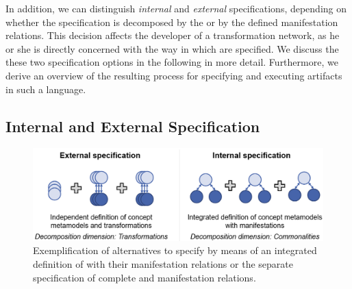 In addition, we can distinguish \emph{internal} and \emph{external} specifications, depending on whether the specification is decomposed by the \commonalities or by the defined manifestation relations.
This decision affects the developer of a transformation network, as he or she is directly concerned with the way in which \commonalities are specified.
We discuss the these two specification options in the following in more detail.
Furthermore, we derive an overview of the resulting process for specifying and executing artifacts in such a language.


\subsection{Internal and External Specification}
\label{chap:language:design:internal_external}

\begin{figure}
    \centering
    \includegraphics[width=\textwidth]{figures/quality/language/design_options.png}
    \caption[Design options for \commonalities specification]{Exemplification of alternatives to specify \commonalities by means of an integrated definition of \commonalities with their manifestation relations or the separate specification of complete \conceptmetamodels and manifestation relations.}
    \label{fig:language:design_options}
\end{figure}

